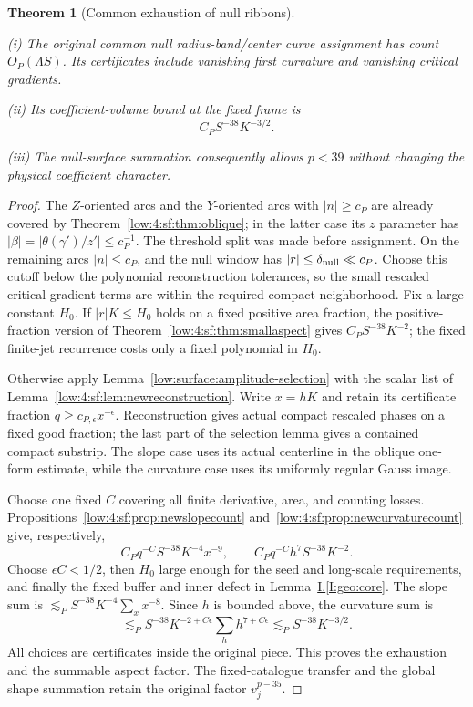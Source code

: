 \documentclass[11pt]{amsart}
\newtheorem{theorem}{Theorem}[section]
\theoremstyle{definition}
\theoremstyle{remark}
\numberwithin{equation}{section}
\newcommand{\partIref}[1]{\hyperref[I:#1]{I.\ref*{I:#1}}}
\begin{document}
\begin{theorem}[Common exhaustion of null ribbons]\label{low:4:sf:thm:newexhaustion}

\noindent\textup{(i)} The original common null radius-band/center curve assignment has count $O_P(\Lambda S)$. Its certificates include vanishing first curvature and vanishing critical gradients.

\noindent\textup{(ii)} Its coefficient-volume bound at the fixed frame is
\[
 \boxed{\qquad C_P S^{-38}K^{-3/2}.\qquad}
\]

\noindent\textup{(iii)} The null-surface summation consequently allows $p<39$ without changing the physical coefficient character.
\end{theorem}
\begin{proof}
The $Z$-oriented arcs and the $Y$-oriented arcs with $|n|\ge c_P$ are already covered by Theorem~\ref{low:4:sf:thm:oblique}; in the latter case its $z$ parameter has $|\beta|=|\theta(\gamma')/z'|\le c_P^{-1}$. The threshold split was made before assignment. On the remaining arcs $|n|\le c_P$, and the null window has $|r|\le\delta_{\rm null}\ll c_P$. Choose this cutoff below the polynomial reconstruction tolerances, so the small rescaled critical-gradient terms are within the required compact neighborhood. Fix a large constant $H_0$. If $|r|K\le H_0$ holds on a fixed positive area fraction, the positive-fraction version of Theorem~\ref{low:4:sf:thm:smallaspect} gives $C_PS^{-38}K^{-2}$; the fixed finite-jet recurrence costs only a fixed polynomial in $H_0$.

Otherwise apply Lemma~\ref{low:surface:amplitude-selection} with the scalar list of Lemma~\ref{low:4:sf:lem:newreconstruction}. Write $x=hK$ and retain its certificate fraction $q\ge c_{P,\epsilon}x^{-\epsilon}$. Reconstruction gives actual compact rescaled phases on a fixed good fraction; the last part of the selection lemma gives a contained compact substrip. The slope case uses its actual centerline in the oblique one-form estimate, while the curvature case uses its uniformly regular Gauss image.

Choose one fixed $C$ covering all finite derivative, area, and counting losses. Propositions~\ref{low:4:sf:prop:newslopecount} and~\ref{low:4:sf:prop:newcurvaturecount} give, respectively,
\[
C_Pq^{-C}S^{-38}K^{-4}x^{-9},\qquad
C_Pq^{-C}h^7S^{-38}K^{-2}.
\]
Choose $\epsilon C<1/2$, then $H_0$ large enough for the seed and long-scale requirements, and finally the fixed buffer and inner defect in Lemma~\partIref{geo:core}. The slope sum is $\lesssim_PS^{-38}K^{-4}\sum_xx^{-8}$. Since $h$ is bounded above, the curvature sum is
\[
\lesssim_PS^{-38}K^{-2+C\epsilon}\sum_h h^{7+C\epsilon}
 \lesssim_PS^{-38}K^{-3/2}.
\]
All choices are certificates inside the original piece. This proves the exhaustion and the summable aspect factor. The fixed-catalogue transfer and the global shape summation retain the original factor $v_j^{p-35}$.
\end{proof}
\end{document}
